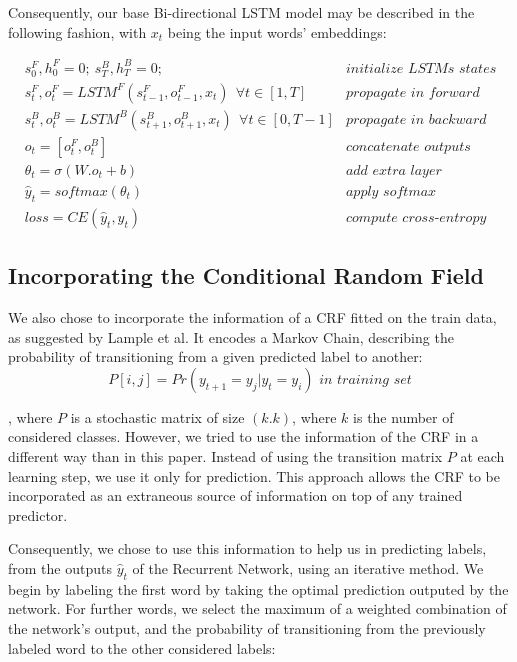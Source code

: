 \documentclass{article} %
\begin{document}
Consequently, our base Bi-directional LSTM model may be described in the
following fashion, with $x_t$ being the input words' embeddings:

\begin{align*}
&s^F_0, h^F_0 = 0;\ s^B_T, h^B_T = 0; &\textit{initialize LSTMs states}
\\
&s^F_t, o^F_t = LSTM^F(s^F_{t-1}, o^F_{t-1}, x_t) \ \ \forall t \in [1, T] &\textit{propagate in forward LSTM}
\\
&s^B_t, o^B_t = LSTM^B(s^B_{t+1}, o^B_{t+1}, x_t) \ \ \forall t \in [0, T-1] &\textit{propagate in backward LSTM}
\\
& o_t = [o^F_t, o^B_t] & \textit{concatenate outputs}
\\
& \theta_t = \sigma(W.o_t + b) & \textit{add extra layer}
\\
& \hat{y}_t =softmax(\theta_t) & \textit{apply softmax}
\\
& loss = CE(\hat{y}_t, y_t) & \textit{compute cross-entropy}
\end{align*}


\subsection{Incorporating the Conditional Random Field}

We also chose to incorporate the information of a CRF fitted on the
train data, as suggested by Lample et al\cite{lample2016neural}. It encodes a Markov Chain, describing the probability of transitioning from a given predicted label to another: \[
P[i, j] = Pr(y_{t+1} = y_j | y_{t} =y_i) \textit{ in training set}
\]

, where $P$ is a stochastic matrix of size $(k.k)$, where $k$ is the number of considered classes. However, we tried to use the information of the CRF in a different way than in this paper. Instead of using the transition matrix $P$ at each learning step, we use it only for prediction. This approach allows the CRF to be incorporated as an extraneous source of information on top of any trained predictor.

Consequently, we chose to use this information to help us in predicting labels, from the outputs $\hat{y}_t$ of the Recurrent Network, using an iterative method. We begin by labeling the first word by taking the optimal prediction outputed by the network. For further words, we select the maximum of a weighted combination of the network's output, and the probability of transitioning from the previously labeled word to the other considered labels:
\end{document}
